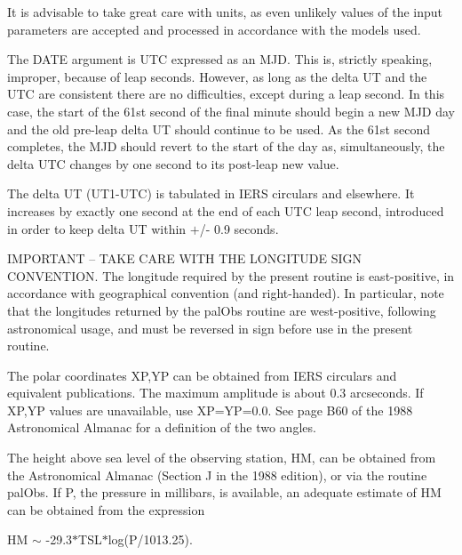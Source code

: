 \documentclass[twoside,11pt,nolof]{starlink}
\begin{document}
{{{         \sstitem
          It is advisable to take great care with units, as even
           unlikely values of the input parameters are accepted and
           processed in accordance with the models used.

         \sstitem
          The DATE argument is UTC expressed as an MJD.  This is,
           strictly speaking, improper, because of leap seconds.  However,
           as long as the delta UT and the UTC are consistent there
           are no difficulties, except during a leap second.  In this
           case, the start of the 61st second of the final minute should
           begin a new MJD day and the old pre-leap delta UT should
           continue to be used.  As the 61st second completes, the MJD
           should revert to the start of the day as, simultaneously,
           the delta UTC changes by one second to its post-leap new value.

         \sstitem
          The delta UT (UT1-UTC) is tabulated in IERS circulars and
           elsewhere.  It increases by exactly one second at the end of
           each UTC leap second, introduced in order to keep delta UT
           within $+$/- 0.9 seconds.

         \sstitem
          IMPORTANT -- TAKE CARE WITH THE LONGITUDE SIGN CONVENTION.
           The longitude required by the present routine is east-positive,
           in accordance with geographical convention (and right-handed).
           In particular, note that the longitudes returned by the
           palObs routine are west-positive, following astronomical
           usage, and must be reversed in sign before use in the present
           routine.

         \sstitem
          The polar coordinates XP,YP can be obtained from IERS
           circulars and equivalent publications.  The maximum amplitude
           is about 0.3 arcseconds.  If XP,YP values are unavailable,
           use XP=YP=0.0.  See page B60 of the 1988 Astronomical Almanac
           for a definition of the two angles.

         \sstitem
          The height above sea level of the observing station, HM,
           can be obtained from the Astronomical Almanac (Section J
           in the 1988 edition), or via the routine palObs.  If P,
           the pressure in millibars, is available, an adequate
           estimate of HM can be obtained from the expression

      }
              HM $\sim$ -29.3$*$TSL$*$log(P/1013.25).

}}
\end{document}
